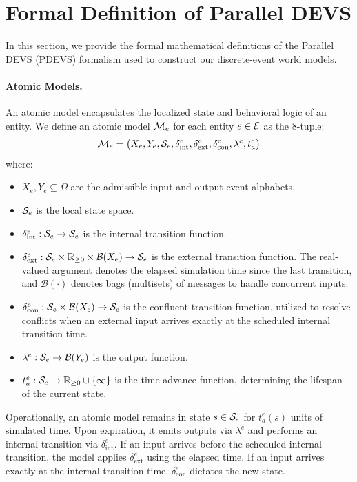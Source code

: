 \section{Formal Definition of Parallel DEVS}
\label{app:devs_formalism}

In this section, we provide the formal mathematical definitions of the Parallel DEVS (PDEVS) formalism \cite{RiscoMartin2023xDEVS} used to construct our discrete-event world models. 

\paragraph{Atomic Models.}
An atomic model encapsulates the localized state and behavioral logic of an entity. We define an atomic model $\mathcal{M}_e$ for each entity $e \in \mathcal{E}$ as the 8-tuple:
\[
\mathcal{M}_e = \bigl(X_e, Y_e, \mathcal{S}_e, \delta_{\mathrm{int}}^e, \delta_{\mathrm{ext}}^e, \delta_{\mathrm{con}}^e, \lambda^e, t_a^e \bigr)
\]
where:
\begin{itemize}[leftmargin=*]
    \item $X_e, Y_e \subseteq \Omega$ are the admissible input and output event alphabets.
    \item $\mathcal{S}_e$ is the local state space.
    \item $\delta_{\mathrm{int}}^e : \mathcal{S}_e \rightarrow \mathcal{S}_e$ is the internal transition function.
    \item $\delta_{\mathrm{ext}}^e : \mathcal{S}_e \times \mathbb{R}_{\ge 0} \times \mathcal{B}(X_e) \rightarrow \mathcal{S}_e$ is the external transition function. The real-valued argument denotes the elapsed simulation time since the last transition, and $\mathcal{B}(\cdot)$ denotes bags (multisets) of messages to handle concurrent inputs.
    \item $\delta_{\mathrm{con}}^e : \mathcal{S}_e \times \mathcal{B}(X_e) \rightarrow \mathcal{S}_e$ is the confluent transition function, utilized to resolve conflicts when an external input arrives exactly at the scheduled internal transition time.
    \item $\lambda^e : \mathcal{S}_e \rightarrow \mathcal{B}(Y_e)$ is the output function.
    \item $t_a^e : \mathcal{S}_e \rightarrow \mathbb{R}_{\ge 0} \cup \{\infty\}$ is the time-advance function, determining the lifespan of the current state.
\end{itemize}

Operationally, an atomic model remains in state $s \in \mathcal{S}_e$ for $t_a^e(s)$ units of simulated time. Upon expiration, it emits outputs via $\lambda^e$ and performs an internal transition via $\delta_{\mathrm{int}}^e$. If an input arrives before the scheduled internal transition, the model applies $\delta_{\mathrm{ext}}^e$ using the elapsed time. If an input arrives exactly at the internal transition time, $\delta_{\mathrm{con}}^e$ dictates the new state.

